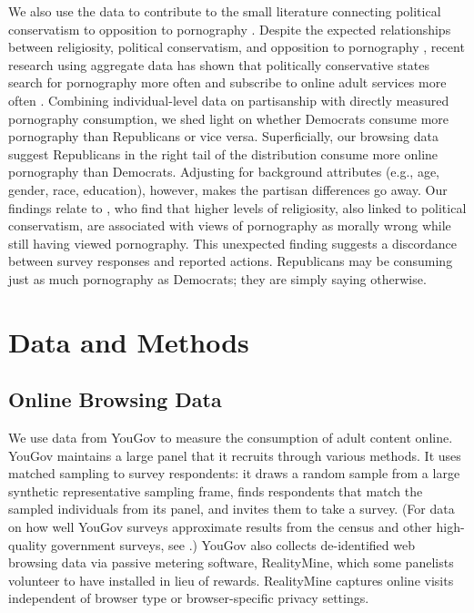 \documentclass[12pt,twoside]{article}
\begin{document}
We also use the data to contribute to the small literature connecting political conservatism to opposition to pornography \citep{Peek1982-ua, Woodrum1992-vk}. Despite the expected relationships between religiosity, political conservatism, and opposition to pornography \citep{Wright2013-an, Perry2018-cn}, recent research using aggregate data has shown that politically conservative states search for pornography more often and subscribe to online adult services more often \citep{macinnis2015american, edelman2009markets}. Combining individual-level data on partisanship with directly measured pornography consumption, we shed light on whether Democrats consume more pornography than Republicans or vice versa. Superficially, our browsing data suggest Republicans in the right tail of the distribution consume more online pornography than Democrats. Adjusting for background attributes (e.g., age, gender, race, education), however, makes the partisan differences go away. Our findings relate to \cite{Perry2018-cn}, who find that higher levels of religiosity, also linked to political conservatism, are associated with views of pornography as morally wrong while still having viewed pornography. This unexpected finding suggests a discordance between survey responses and reported actions. Republicans may be consuming just as much pornography as Democrats; they are simply saying otherwise. 


\section{Data and Methods}
\label{sec:data}

\subsection{Online Browsing Data}
\label{subsec:online_browse_data}

We use data from YouGov to measure the consumption of adult content online. YouGov maintains a large panel that it recruits through various methods. It uses matched sampling to survey respondents: it draws a random sample from a large synthetic representative sampling frame, finds respondents that match the sampled individuals from its panel, and invites them to take a survey. (For data on how well YouGov surveys approximate results from the census and other high-quality government surveys, see \citet{rivers2009, graham2021advantages, foote2021measuring}.) YouGov also collects de-identified web browsing data via passive metering software, RealityMine, which some panelists volunteer to have installed in lieu of rewards. RealityMine captures online visits independent of browser type or browser-specific privacy settings.
\end{document}
